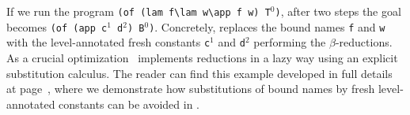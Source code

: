 \documentclass{llncs}
\begin{document}
If we run the program
\verb+(of (lam f\lam w\app f w) T+$^0$\verb+)+, after two steps the goal becomes
\verb+(of (app c+$^1$\verb+ d+$^2$\verb+) B+$^0$\verb+)+.
Concretely, \tedius{} replaces the bound names \verb+f+ and \verb+w+ with 
the level-annotated fresh constants \verb+c+$^1$ and \verb+d+$^2$ performing 
the $\beta$-reductions.
As a crucial optimization~\cite{DBLP:journals/jar/LiangNQ04} \tedius{}
implements reductions in a lazy way using an explicit substitution
calculus.
The reader can find this example developed
in full details at page~\pageref{detailed},
where we demonstrate how substitutions of bound names by fresh
level-annotated constants can be avoided in \rff{}.

% 
% 
\end{document}

